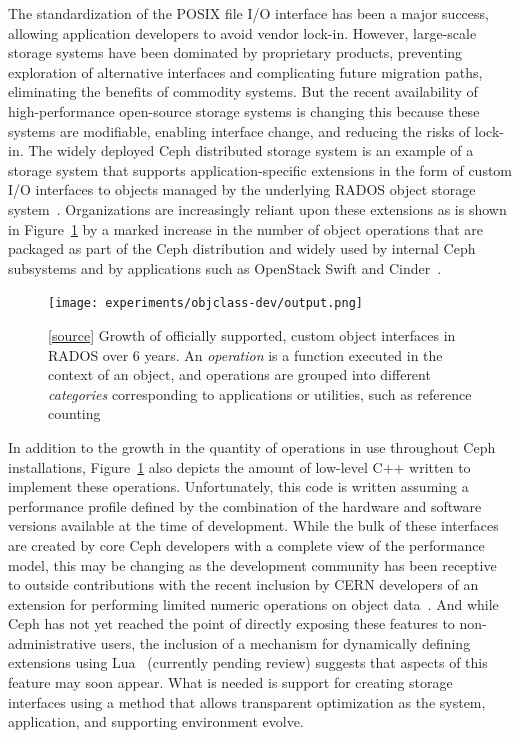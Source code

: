 \documentclass[10pt,twocolumn]{article}
\begin{document}

The standardization of the POSIX file I/O interface has been a major success,
allowing application developers to avoid vendor lock-in. However, large-scale
storage systems have been dominated by proprietary products, preventing
exploration of alternative interfaces and complicating future migration paths,
eliminating the benefits of commodity systems. But the recent availability of
high-performance open-source storage systems is changing this because these
systems are modifiable, enabling interface change, and reducing the risks of
lock-in. The widely deployed Ceph distributed storage system is an example of
a storage system that supports application-specific extensions in the form of
custom I/O interfaces to objects managed by the underlying RADOS object
storage system~\cite{weil:osdi06,weil:pdsw07}. Organizations are increasingly
reliant upon these extensions as is shown in Figure~\ref{fig:objclass-dev} by
a marked increase in the number of object operations that are packaged as part
of the Ceph distribution and widely used by internal Ceph subsystems and by
applications such as OpenStack Swift and Cinder~\cite{openstack}.

\begin{figure}[t]
  \centering
    \texttt{[image: experiments/objclass-dev/output.png]}
    \caption{
[\href{https://github.com/noahdesu/zlog-popper/tree/master/experiments/objclass-dev/visualize.ipynb}{source}]
Growth of officially supported, custom object interfaces in RADOS over 6
years. An \emph{operation} is a function executed in the context of an object,
and operations are grouped into different \emph{categories}
corresponding to applications or utilities, such as reference counting}
\label{fig:objclass-dev}
\end{figure}

In addition to the growth in the quantity of operations in use throughout Ceph
installations, Figure~\ref{fig:objclass-dev} also depicts the amount of
low-level C++ written to implement these operations. Unfortunately, this code
is written assuming a performance profile defined by the combination of the
hardware and software versions available at the time of development.  While
the bulk of these interfaces are created by core Ceph developers with a
complete view of the performance model, this may be changing as the
development community has been receptive to outside contributions with the
recent inclusion by CERN developers of an extension for performing limited
numeric operations on object data~\cite{cls_numops}. And while Ceph has not
yet reached the point of directly exposing these features to
non-administrative users, the inclusion of a mechanism for dynamically
defining extensions using Lua~\cite{cls_lua} (currently pending review)
suggests that aspects of this
feature may soon appear. What is needed is support for creating storage
interfaces using a method that allows transparent optimization as the system,
application, and supporting environment evolve.
\end{document}
